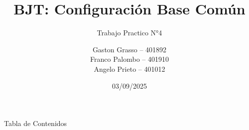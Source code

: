\documentclass[]{beamer}
\title[BJT Base Común]{BJT: Configuración Base Común}
\subtitle{Trabajo Practico N°4}
\author[Grasso, Palombo, Prieto]{%
  \begin{tabular}{l}
      Gaston Grasso -- 401892 \\
    Franco Palombo -- 401910 \\
      Angelo Prieto -- 401012
  \end{tabular}
}
\institute[UTN - FRC]{Universidad Tecnológica Nacional, Facultad Regional Córdoba}
\date[2025]{03/09/2025}
\begin{document}
\frame{\titlepage}
\begin{frame}{Tabla de Contenidos}
  \tableofcontents[hideothersubsections]
\end{frame}





\end{document}
